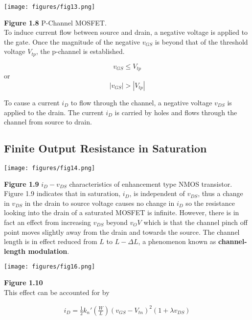 \documentclass[12pt]{article}
\begin{document}
    \begin{center}
        \texttt{[image: figures/fig13.png]}
    \end{center}

    \textbf{Figure 1.8} P-Channel MOSFET.\\[\baselineskip]
    To induce current flow between source and drain, a negative voltage is applied to the gate. Once
    the magnitude of the negative $v_{GS}$ is beyond that of the threshold voltage $V_{tp}$, the 
    p-channel is established.

    $$v_{GS} \leq V_{tp}$$
    or
    $$|v_{GS}| > |V_{tp}|$$

    To cause a current $i_D$ to flow through the channel, a negative voltage $v_{DS}$ is applied to 
    the drain. The current $i_D$ is carried by holes and flows through the channel from source to drain.

    \subsection*{Finite Output Resistance in Saturation}

    \begin{center}
        \texttt{[image: figures/fig14.png]}
    \end{center}

    \textbf{Figure 1.9} $i_D-v_{DS}$ characteristics of enhancement type NMOS transistor.\\[\baselineskip]
    Figure 1.9 indicates that in saturation, $i_D$, is independent of $v_{DS}$, thus a change in 
    $v_{DS}$ in the drain to source voltage causes no change in $i_D$ so the resistance looking 
    into the drain of a saturated MOSFET is infinite. However, there is in fact an effect from
    increasing $v_{DS}$ beyond $v_OV$ which is that the channel pinch off point moves slightly 
    away from the drain and towards the source. The channel length is in effect reduced from 
    $L$ to $L-\Delta L$, a phenomenon known as \textbf{channel-length modulation}. 

    \begin{center}
        \texttt{[image: figures/fig16.png]}
    \end{center}

    \textbf{Figure 1.10}\\[\baselineskip]
    This effect can be accounted for by

    \begin{align}
        i_D = \frac{1}{2}k_n'\left(\frac{W}{L}\right)(v_{GS}-V_{tn})^2(1+\lambda v_{DS})
    \end{align}
\end{document}
